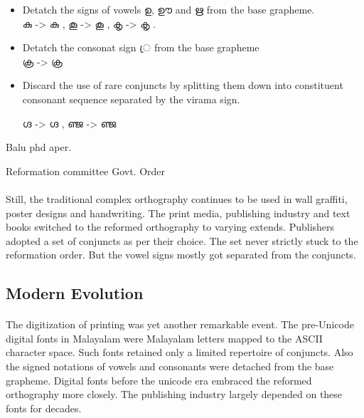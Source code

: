 \documentclass[10pt]{article}
\begin{document}
\begin{itemize}
\item
Detatch the signs of vowels \begingroup \manjari ഉ, ഊ and  ഋ \endgroup from the base grapheme.\\
\begingroup \manjari കു  \endgroup -> \begingroup \raghu കു  \endgroup ,
\begingroup \manjari കൂ  \endgroup -> \begingroup \raghu  കൂ  \endgroup ,
\begingroup \manjari കൃ  \endgroup -> \begingroup \raghu കൃ  \endgroup .
\item 
Detatch the consonat sign \begingroup \manjari   ്ര  \endgroup from the base grapheme \\
\begingroup \manjari ക്ര   \endgroup -> \begingroup \raghu ക്ര   \endgroup 

\item
Discard the use of rare conjuncts by splitting them down into constituent consonant sequence separated by the virama sign.

\begingroup \manjari ഗ്ദ \endgroup -> \begingroup \raghu  ഗ്ദ  \endgroup, \begingroup \manjari ഞ്ജ  \endgroup -> \begingroup \raghu  ഞ്ജ  \endgroup \\


\end{itemize}

Balu phd aper.

Reformation committee
Govt. Order

\paragraph{}
Still, the traditional complex orthography continues to be used in wall graffiti, poster designs and handwriting. The print media, publishing industry  and text books switched to the reformed orthography to varying extends. Publishers adopted a set of conjuncts as per their choice. The set never strictly stuck to the reformation order. But the vowel signs mostly got separated from the conjuncts. 

\subsection{Modern Evolution}
\paragraph{}
The digitization of printing was yet another remarkable event. The pre-Unicode digital fonts in Malayalam were Malayalam letters mapped to the ASCII character space.  Such fonts retained only a limited repertoire of conjuncts. Also the signed notations of vowels and consonants were detached from the base grapheme. Digital fonts before the unicode era embraced the reformed orthography more closely. The publishing industry largely depended on these fonts for decades.
\end{document}
